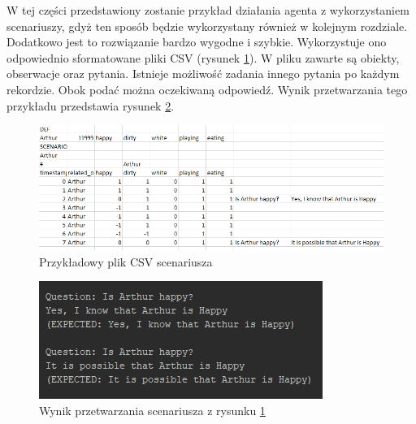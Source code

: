 W tej części przedstawiony zostanie przykład działania agenta z wykorzystaniem scenariuszy, gdyż ten sposób będzie wykorzystany również w kolejnym rozdziale. Dodatkowo jest to rozwiązanie bardzo wygodne i szybkie. Wykorzystuje ono odpowiednio sformatowane pliki CSV (rysunek \ref{rys:scenariusz}). W pliku zawarte są obiekty, obserwacje oraz pytania. Istnieje możliwość zadania innego pytania po każdym rekordzie. Obok podać można oczekiwaną odpowiedź. Wynik przetwarzania tego przykładu przedstawia rysunek \ref{rys:wynik}.

\begin{figure}  
	\centering\includegraphics[width=\textwidth]{img/scenariusz}
	\caption{Przykładowy plik CSV scenariusza}
	\label{rys:scenariusz}
\end{figure}

\begin{figure}  
	\centering\includegraphics[width=.5\textwidth]{img/wynik}
	\caption{Wynik przetwarzania scenariusza z rysunku \ref{rys:scenariusz}}
	\label{rys:wynik}
\end{figure}








